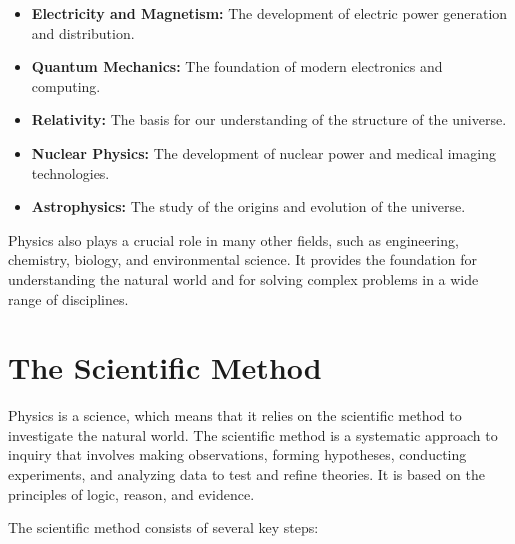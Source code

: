 \begin{itemize}
    \item \textbf{Electricity and Magnetism:} The development of electric power generation and distribution.
    \item \textbf{Quantum Mechanics:} The foundation of modern electronics and computing.
    \item \textbf{Relativity:} The basis for our understanding of the structure of the universe.
    \item \textbf{Nuclear Physics:} The development of nuclear power and medical imaging technologies.
    \item \textbf{Astrophysics:} The study of the origins and evolution of the universe.
    
\end{itemize}

Physics also plays a crucial role in many other fields, such as engineering, chemistry, biology, and environmental science. It provides the foundation for understanding the natural world and for solving complex problems in a wide range of disciplines.

\section{The Scientific Method}

Physics is a science, which means that it relies on the scientific method to investigate the natural world. The scientific method is a systematic approach to inquiry that involves making observations, forming hypotheses, conducting experiments, and analyzing data to test and refine theories. It is based on the principles of logic, reason, and evidence.

The scientific method consists of several key steps:


